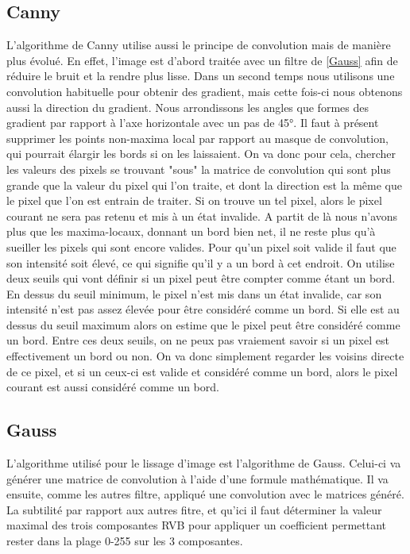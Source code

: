 \documentclass[twoside,openright,a4paper,11pt,french]{article}
\begin{document}
\subsection{Canny}
L'algorithme de Canny utilise aussi le principe de convolution mais de manière plus évolué.
En effet, l'image est d'abord traitée avec un filtre de \ref{Gauss} afin de réduire le bruit et
la rendre plus lisse.
Dans un second temps nous utilisons une convolution habituelle pour obtenir des gradient, mais cette fois-ci
nous obtenons aussi la direction du gradient. Nous arrondissons les angles que formes des gradient par rapport
à l'axe horizontale avec un pas de 45°.
Il faut à présent supprimer les points non-maxima local par rapport au masque de convolution, qui pourrait
élargir les bords si on les laissaient. On va donc pour cela, chercher les valeurs des pixels se trouvant "sous"
la matrice de convolution qui sont plus grande que la valeur du pixel qui l'on traite, et dont la direction est
la même que le pixel que l'on est entrain de traiter. Si on trouve un tel pixel, alors le pixel courant ne 
sera pas retenu et mis à un état invalide.
A partit de là nous n'avons plus que les maxima-locaux, donnant un bord bien net, il ne reste plus
qu'à sueiller les pixels qui sont encore valides. Pour qu'un pixel soit valide il faut que son intensité soit
élevé, ce qui signifie qu'il y a un bord à cet endroit. On utilise deux seuils qui vont définir si un pixel
peut être compter comme étant un bord. En dessus du seuil minimum, le pixel n'est mis dans un état invalide,
car son intensité n'est pas assez élevée pour être considéré comme un bord. Si elle est au dessus du seuil
maximum alors on estime que le pixel peut être considéré comme un bord. Entre ces deux seuils, on ne peux pas
vraiement savoir si un pixel est effectivement un bord ou non. On va donc simplement regarder les voisins directe
de ce pixel, et si un ceux-ci est valide et considéré comme un bord, alors le pixel courant est aussi considéré
comme un bord.

\subsection{Gauss}
\label{sec:gauss}
L'algorithme utilisé pour le lissage d'image est l'algorithme de Gauss. Celui-ci va générer une
matrice de convolution à l'aide d'une formule mathématique. Il va ensuite, comme les autres filtre,
appliqué une convolution avec le matrices généré. La subtilité par rapport aux autres fitre, et qu'ici
il faut déterminer la valeur maximal des trois composantes RVB pour appliquer un coefficient
permettant rester dans la plage 0-255 sur les 3 composantes.
\end{document}
